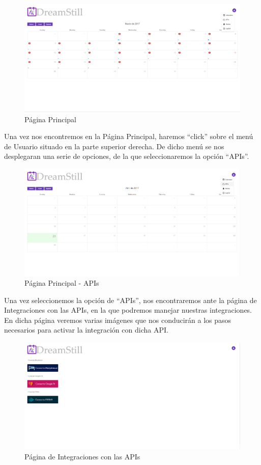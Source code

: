\documentclass[11pt,openany]{book}
\begin{document}
\begin{figure}[H]
\centering
\includegraphics[totalheight=6cm]{manualUsuario/paginaPrincipal.png}
\caption{Página Principal}
\end{figure}

Una vez nos encontremos en la Página Principal, haremos ``click'' sobre el menú de Usuario situado en la parte superior derecha. De dicho menú se nos desplegaran una serie de opciones, de la que seleccionaremos la opción ``APIs''.

\begin{figure}[H]
\centering
\includegraphics[totalheight=6cm]{manualUsuario/apis.png}
\caption{Página Principal - APIs}
\end{figure}

Una vez seleccionemos la opción de ``APIs'', nos encontraremos ante la página de Integraciones con las APIs, en la que podremos manejar nuestras integraciones. En dicha página veremos varias imágenes que nos conducirán a los pasos necesarios para activar la integración con dicha API.

\begin{figure}[H]
\centering
\includegraphics[totalheight=6cm]{manualUsuario/paginaApis.png}
\caption{Página de Integraciones con las APIs}
\end{figure}
\end{document}
